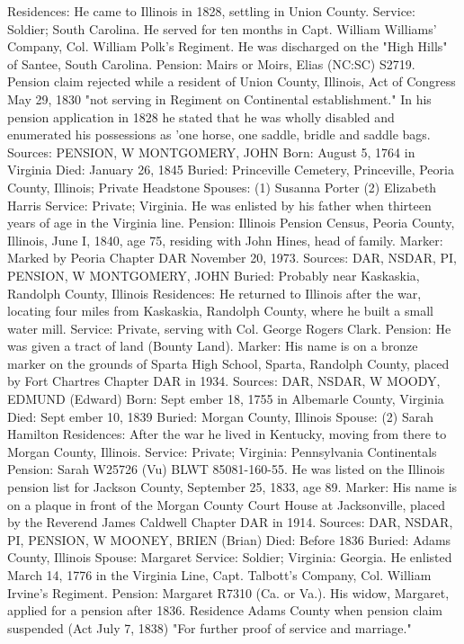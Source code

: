 Residences: He came to Illinois in 1828, settling in Union County.
Service: Soldier; South Carolina. He served for ten months in Capt. William Williams' Company, Col. William Polk's Regiment. He was discharged on the "High Hills" of Santee, South Carolina. 
Pension: Mairs or Moirs, Elias (NC:SC) S2719. Pension claim rejected while a resident of Union County, Illinois, Act of Congress May 29, 1830 "not serving in Regiment on Continental establishment." In his pension application in 1828 he stated that he was wholly disabled and enumerated his possessions as 'one horse, one saddle, bridle and saddle bags. 
Sources: PENSION, W 
MONTGOMERY, JOHN
Born: August 5, 1764 in Virginia
Died: January 26, 1845
Buried: Princeville Cemetery, Princeville, Peoria County, Illinois; Private Head­stone
Spouses: (1) Susanna Porter
	            (2) Elizabeth Harris
Service: Private; Virginia. He was enlisted by his father when thirteen years of 
	                  age in the Virginia line.
Pension: Illinois Pension Census, Peoria County, Illinois, June I, 1840, 
                     age 75, residing with John Hines, head of family.
Marker: Marked by Peoria Chapter DAR November 20, 1973.
Sources: DAR, NSDAR, PI, PENSION, W 
MONTGOMERY, JOHN 
Buried: Probably near Kaskaskia, Randolph County, Illinois
Residences: He returned to Illinois after the war, locating four miles from Kas­kaskia, Randolph County, where he built a small water mill.
Service: Private, serving with Col. George Rogers Clark.
Pension: He was given a tract of land (Bounty Land).
Marker: His name is on a bronze marker on the grounds of Sparta High School, Sparta, Randolph County, placed by Fort Chartres Chapter DAR in 1934.
Sources: DAR, NSDAR, W
MOODY, EDMUND (Edward)
Born: Sept ember 18, 1755 in Albemarle County, Virginia
Died: Sept ember 10, 1839 
Buried: Morgan County, Illinois 
Spouse: (2) Sarah Hamilton 
Residences: After the war he lived in Kentucky, moving from there to Morgan County, Illinois. 
Service: Private; Virginia: Pennsylvania Continentals
Pension: Sarah W25726 (Vu) BLWT 85081-160-55. He was listed on the Illinois pension list for Jackson County, September 25, 1833, age 89.
Marker: His name is on a plaque in front of the Morgan County Court House at Jacksonville, placed by the Reverend James Caldwell Chapter DAR in 1914.
Sources: DAR, NSDAR, PI, PENSION, W 
MOONEY, BRIEN (Brian)
Died: Before 1836
Buried:  Adams County, Illinois
Spouse: Margaret 
Service: Soldier; Virginia: Georgia. He enlisted March 14, 1776 in the Virginia Line, Capt. Talbott's  Company, Col. William Irvine's Regiment. 
Pension: Margaret R7310 (Ca. or Va.). His widow, Margaret, applied for a pen­sion after 1836. Residence Adams County when pension claim suspended (Act July 7, 1838) "For further proof of service and marriage." 
